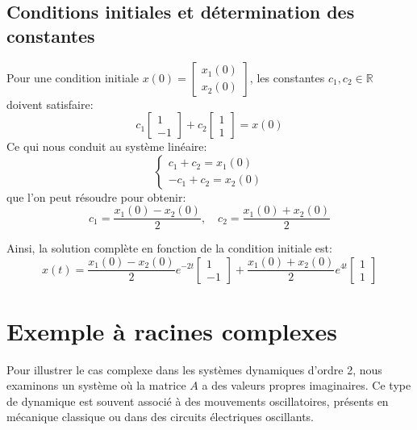         \subsection{Conditions initiales et détermination des constantes}
            Pour une condition initiale $x(0)=\begin{bmatrix} x_1(0) \\ x_2(0) \end{bmatrix}$, les constantes $c_1, c_2 \in \mathbb{R}$ doivent satisfaire:
            \begin{equation}
                c_1 \begin{bmatrix} 1 \\ -1 \end{bmatrix} + c_2 \begin{bmatrix} 1 \\ 1 \end{bmatrix}=x(0)
            \end{equation}
            Ce qui nous conduit au système linéaire:
            \begin{equation}
                \begin{cases}
                    c_1 + c_2=x_1(0) \\
                    -c_1 + c_2=x_2(0)
                \end{cases}
            \end{equation}
            que l’on peut résoudre pour obtenir:
            \begin{equation}
                c_1=\frac{x_1(0) - x_2(0)}{2}, \quad c_2=\frac{x_1(0) + x_2(0)}{2}
            \end{equation}
            
            Ainsi, la solution complète en fonction de la condition initiale est:
            \begin{equation}
                x(t)=\frac{x_1(0) - x_2(0)}{2} e^{-2t} \begin{bmatrix} 1 \\ -1 \end{bmatrix} + \frac{x_1(0) + x_2(0)}{2} e^{4t} \begin{bmatrix} 1 \\ 1 \end{bmatrix}
            \end{equation}

    \section{Exemple à racines complexes}
        Pour illustrer le cas complexe dans les systèmes dynamiques d'ordre 2, nous examinons un système où la matrice $A$ a des valeurs propres imaginaires. Ce type de dynamique est souvent associé à des mouvements oscillatoires, présents en mécanique classique ou dans des circuits électriques oscillants.
        
